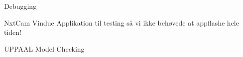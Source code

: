 



Debugging

NxtCam Vindue Applikation til testing så vi ikke behøvede at appflashe hele tiden!

UPPAAL Model Checking

